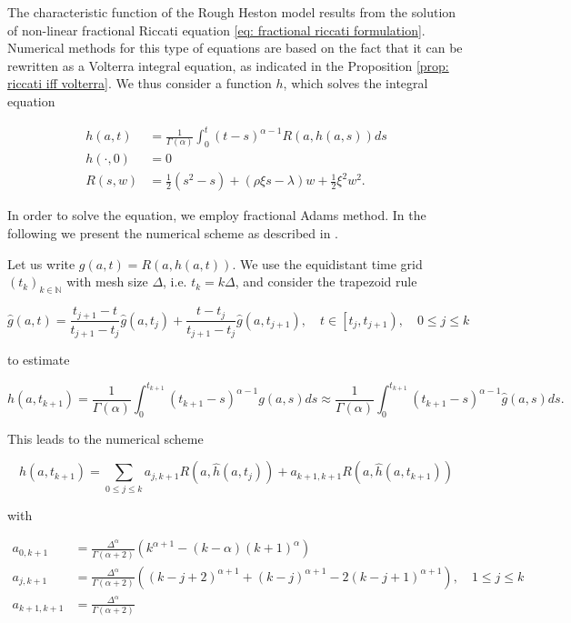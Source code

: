 \documentclass[12pt,twoside]{article}
\theoremstyle{plain}
\theoremstyle{plain}
\theoremstyle{definition}
\theoremstyle{remark}
\numberwithin{equation}{section}
\begin{document}
The characteristic function of the Rough Heston model results from the solution of non-linear fractional Riccati equation \eqref{eq: fractional riccati formulation}. Numerical methods for this type of equations are based on the fact that it can be rewritten as a Volterra integral equation, as indicated in the Proposition \ref{prop: riccati iff volterra}. We thus consider a function $h$, which solves the integral equation

$$
\begin{aligned}
h(a, t)&=\frac{1}{\Gamma(\alpha)} \int_{0}^{t}(t-s)^{\alpha-1} R(a, h(a, s)) d s\\[10pt]
h(\cdot , 0)&= 0\\
R(s, w)&=\frac{1}{2}\left(s^{2}-s\right)+(\rho \xi s-\lambda) w+\frac{1}{2} \xi^{2} w^{2}.
\end{aligned}
$$

\vspace{10pt}

In order to solve the equation, we employ fractional Adams method. In the following we present the numerical scheme as described in \cite{ER16}.

Let us write $g(a, t) = R(a, h(a, t))$. We use the equidistant time grid $(t_k)_{k \in \mathbb N}$ with mesh size $\Delta$, i.e. $t_k = k \Delta$, and consider the trapezoid rule 

$$
\hat{g}(a, t)=\frac{t_{j+1}-t}{t_{j+1}-t_{j}} \hat{g}\left(a, t_{j}\right)+\frac{t-t_{j}}{t_{j+1}-t_{j}} \hat{g}\left(a, t_{j+1}\right), \quad t \in\left[t_{j}, t_{j+1}\right), \quad 0 \leq j \leq k
$$

to estimate

$$
h\left(a, t_{k+1}\right)=\frac{1}{\Gamma(\alpha)} \int_{0}^{t_{k+1}}\left(t_{k+1}-s\right)^{\alpha-1} g(a, s) d s \approx 
\frac{1}{\Gamma(\alpha)} \int_{0}^{t_{k+1}}\left(t_{k+1}-s\right)^{\alpha-1} \hat{g}(a, s) d s.
$$

This leads to the numerical scheme

$$
\hat{h}\left(a, t_{k+1}\right)=\sum_{0 \leq j \leq k} a_{j, k+1} R\left(a, \hat{h}\left(a, t_{j}\right)\right)+a_{k+1, k+1} R\left(a, \hat{h}\left(a, t_{k+1}\right)\right)
$$

with

$$
\begin{aligned}
a_{0, k+1}&=\frac{\Delta^{\alpha}}{\Gamma(\alpha+2)}\left(k^{\alpha+1}-(k-\alpha)(k+1)^{\alpha}\right) \\
a_{j, k+1}&=\frac{\Delta^{\alpha}}{\Gamma(\alpha+2)}\left((k-j+2)^{\alpha+1}+(k-j)^{\alpha+1}-2(k-j+1)^{\alpha+1}\right), \quad 1 \leq j \leq k \\
a_{k+1, k+1} &=\frac{\Delta^{\alpha}}{\Gamma(\alpha+2)}
\end{aligned}
$$
\end{document}
